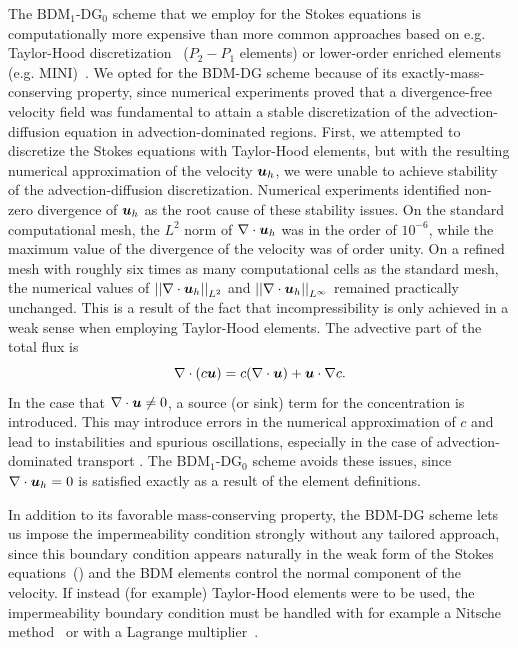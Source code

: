 \documentclass{WileyMSP-template}
\begin{document}
The $\mathrm{BDM}_1$-$\mathrm{DG}_0$ scheme that we employ for the Stokes equations
is computationally more expensive than more common approaches based on
e.g. Taylor-Hood discretization~\cite{Stenberg1990ErrorProblem}
($P_2-P_1$ elements) or lower-order enriched
elements (e.g. MINI)~\cite{Brezzi2011MixedMethods}.
We opted for the BDM-DG scheme because of its exactly-mass-conserving property,
since numerical experiments proved that a divergence-free velocity field was
fundamental to attain a stable discretization of the advection-diffusion equation
in advection-dominated regions. First, we attempted
to discretize the Stokes equations with 
Taylor-Hood elements, but with the resulting numerical approximation
of the velocity $\bm{u}_h$, we were unable to achieve
stability of the advection-diffusion discretization.
Numerical experiments identified non-zero divergence of $\bm{u}_h$
as the root cause of these stability issues.
On the standard computational mesh, the $L^2$ norm of $\nabla\cdot\bm{u}_h$ was
in the order of $10^{-6}$, while the
maximum value of the divergence of the velocity was of order unity.
On a refined mesh with roughly six times as many
computational cells as the standard mesh, the numerical values of
${\vert\vert\nabla\cdot\bm{u}_h\vert\vert}_{L^2}$ and ${\vert\vert\nabla\cdot\bm{u}_h\vert\vert}_{L^{\infty}}$
remained practically unchanged. This is a result
of the fact that incompressibility is only achieved in a weak sense when
employing Taylor-Hood elements. The advective part of the total flux
is
\begin{equation*}
    \nabla\cdot(c\bm{u}) = c(\nabla\cdot\bm{u}) + \bm{u}\cdot\nabla c.
\end{equation*}
In the case that $\nabla\cdot\bm{u}\neq 0$, a source (or sink) term for the concentration
is introduced. This may introduce errors in the numerical approximation of $c$
and lead to instabilities and spurious oscillations, especially in the case of
advection-dominated transport
\cite{gresho1998incompressible, cesmelioglu2022compatible, johnson2009numerical}.
The $\mathrm{BDM}_1$-$\mathrm{DG}_0$ scheme avoids these issues,
since $\nabla\cdot\bm{u}_h=0$ is satisfied exactly as a result of the element definitions.

In addition to its favorable mass-conserving property, the BDM-DG scheme
lets us impose the impermeability condition strongly without any tailored approach,
since this boundary condition appears naturally in the weak form of the
Stokes equations~() and the BDM elements control
the normal component of the velocity. If instead (for example) Taylor-Hood
elements were to be used, the impermeability boundary condition must
be handled with for example a Nitsche method~\cite{Nitsche1971UberSind}
or with a Lagrange multiplier~\cite{Babuska1973TheMultipliers,
Bertoluzza2017BoundaryHemodynamics}.
\end{document}
